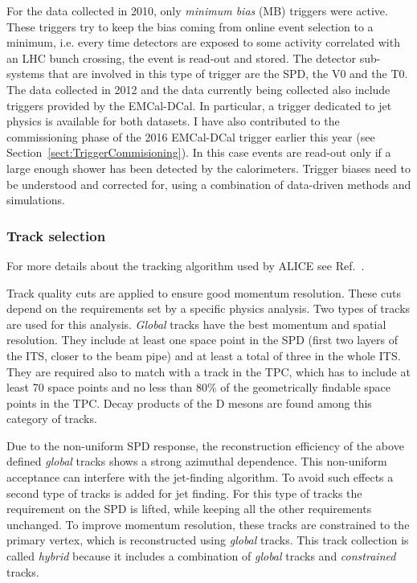 \documentclass[12pt, a4paper, twoside, titlepage]{article}
\begin{document}
For the data collected in 2010, only \emph{minimum bias} (MB) triggers were active. These triggers
try to keep the bias coming from online event selection to a minimum, i.e. every time detectors
are exposed to some activity correlated with an LHC bunch crossing, the event is read-out and stored.
The detector sub-systems that are involved in this type of trigger are the SPD, the V0 and the T0.
The data collected in 2012 and the data currently being collected also include triggers
provided by the EMCal-DCal. In particular, a trigger dedicated to jet physics is available for both datasets. 
I have also contributed to the commissioning phase of the 2016 EMCal-DCal trigger earlier this year (see Section~\ref{sect:TriggerCommisioning}).
In this case events are read-out only if a large enough shower has been detected by the calorimeters.
Trigger biases need to be understood and corrected for, using a combination of data-driven methods and simulations.

\subsubsection{Track selection}
For more details about the tracking algorithm used by ALICE see Ref.~\cite{ALICE:2014b}.

Track quality cuts are applied to ensure good momentum resolution. These cuts
depend on the requirements set by a specific physics analysis.
Two types of tracks are used for this analysis. \emph{Global} tracks have the best
momentum and spatial resolution. They include at least one space point in the SPD (first two
layers of the ITS, closer to the beam pipe) and at least a total of three in the whole ITS. They are required also to
match with a track in the TPC, which has to include at least 70 space points and no less than 80\% of the geometrically findable 
space points in the TPC. Decay products of the D mesons are found among this category of tracks.

Due to the non-uniform SPD response, the reconstruction efficiency of the above defined \emph{global} tracks shows a strong azimuthal dependence.
This non-uniform acceptance can interfere with the jet-finding algorithm. To avoid such effects a second type of tracks is added for jet finding.
For this type of tracks the requirement on the SPD is lifted, while keeping all the other requirements unchanged. To improve momentum resolution,
these tracks are constrained to the primary vertex, which is reconstructed using \emph{global} tracks. This track collection is called \emph{hybrid} because
it includes a combination of \emph{global} tracks and \emph{constrained} tracks.
\end{document}
